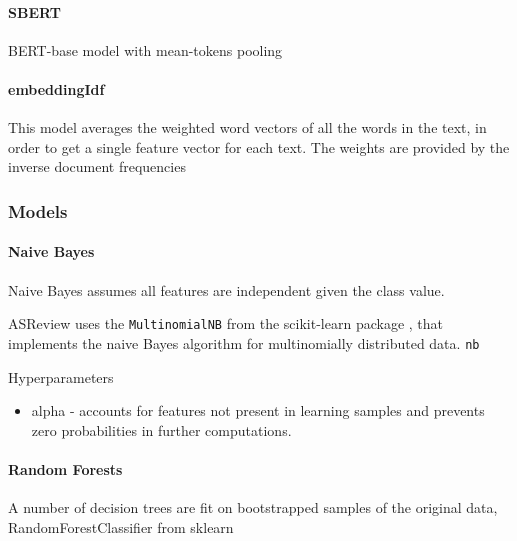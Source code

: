 \documentclass[
]{article}
\providecommand{\tightlist}{%
  \setlength{\itemsep}{0pt}\setlength{\parskip}{0pt}}
\begin{document}
\hypertarget{sbert}{%
\paragraph{SBERT}\label{sbert}}

BERT-base model with mean-tokens pooling \autocite{Reimers2019}

\hypertarget{embeddingidf}{%
\paragraph{embeddingIdf}\label{embeddingidf}}

This model averages the weighted word vectors of all the words in the
text, in order to get a single feature vector for each text. The weights
are provided by the inverse document frequencies

\hypertarget{models-1}{%
\subsubsection{Models}\label{models-1}}

\hypertarget{naive-bayes}{%
\paragraph{Naive Bayes}\label{naive-bayes}}

Naive Bayes assumes all features are independent given the class value.
\autocite{Zhang2004}

ASReview uses the \texttt{MultinomialNB} from the scikit-learn package
\autocite{scikit-learn}, that implements the naive Bayes algorithm for
multinomially distributed data. \texttt{nb}

Hyperparameters

\begin{itemize}
\tightlist
\item
  alpha - accounts for features not present in learning samples and
  prevents zero probabilities in further computations.
\end{itemize}

\hypertarget{random-forests}{%
\paragraph{Random Forests}\label{random-forests}}

A number of decision trees are fit on bootstrapped samples of the
original data, \autocite{Breiman2001} RandomForestClassifier from
sklearn
\end{document}
